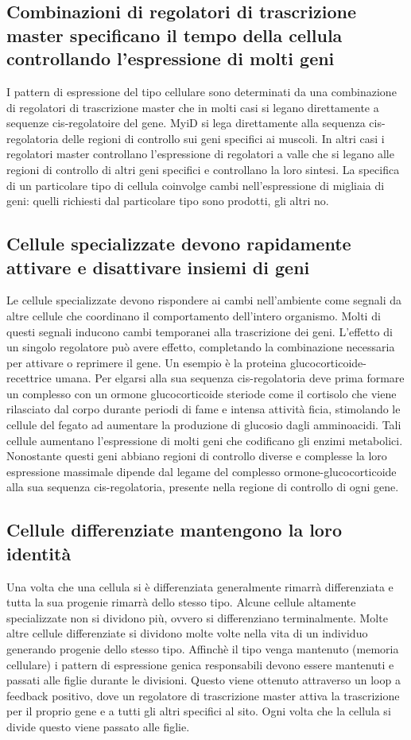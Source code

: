 \subsection{Combinazioni di regolatori di trascrizione master specificano il tempo della cellula controllando l'espressione di molti geni}
I pattern di espressione del tipo cellulare sono determinati da una combinazione di regolatori di trascrizione master che in molti casi si legano direttamente a sequenze cis-regolatoire
del gene. MyiD si lega direttamente alla sequenza cis-regolatoria delle regioni di controllo sui geni specifici ai muscoli. In altri casi i regolatori master controllano l'espressione
di regolatori a valle che si legano alle regioni di controllo di altri geni specifici e controllano la loro sintesi. La specifica di un particolare tipo di cellula coinvolge cambi 
nell'espressione di migliaia di geni: quelli richiesti dal particolare tipo sono prodotti, gli altri no. 
\subsection{Cellule specializzate devono rapidamente attivare e disattivare insiemi di geni}
Le cellule specializzate devono rispondere ai cambi nell'ambiente come segnali da altre cellule che coordinano il comportamento dell'intero organismo. Molti di questi segnali inducono
cambi temporanei alla trascrizione dei geni. L'effetto di un singolo regolatore pu\`o avere effetto, completando la combinazione necessaria per attivare o reprimere il gene. Un esempio 
\`e la proteina glucocorticoide-recettrice umana. Per elgarsi alla sua sequenza cis-regolatoria deve prima formare un complesso con un ormone glucocorticoide steriode come il cortisolo
che viene rilasciato dal corpo durante periodi di fame e intensa attivit\`a ficia, stimolando le cellule del fegato ad aumentare la produzione di glucosio dagli amminoacidi. Tali 
cellule aumentano l'espressione di molti geni che codificano gli enzimi metabolici. Nonostante questi geni abbiano regioni di controllo diverse e complesse la loro espressione massimale
dipende dal legame del complesso ormone-glucocorticoide alla sua sequenza cis-regolatoria, presente nella regione di controllo di ogni gene. 
\subsection{Cellule differenziate mantengono la loro identit\`a}
Una volta che una cellula si \`e differenziata generalmente rimarr\`a differenziata e tutta la sua progenie rimarr\`a dello stesso tipo. Alcune cellule altamente specializzate non si
dividono pi\`u, ovvero si differenziano terminalmente. Molte altre cellule differenziate si dividono molte volte nella vita di un individuo generando progenie dello stesso tipo. 
Affinch\`e il tipo venga mantenuto (memoria cellulare) i pattern di espressione genica responsabili devono essere mantenuti e passati alle figlie durante le divisioni. Questo 
viene ottenuto attraverso un loop a feedback positivo, dove un regolatore di trascrizione master attiva la trascrizione per il proprio gene e a tutti gli altri specifici al sito. Ogni
volta che la cellula si divide questo viene passato alle figlie. 
